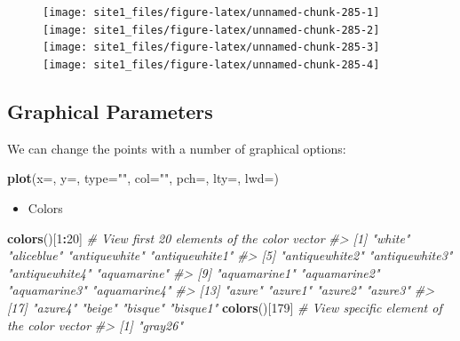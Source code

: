 \documentclass[]{book}
\newenvironment{Shaded}{\begin{snugshade}}{\end{snugshade}}
\newcommand{\CommentTok}[1]{\textcolor[rgb]{0.56,0.35,0.01}{\textit{#1}}}
\newcommand{\DataTypeTok}[1]{\textcolor[rgb]{0.13,0.29,0.53}{#1}}
\newcommand{\DecValTok}[1]{\textcolor[rgb]{0.00,0.00,0.81}{#1}}
\newcommand{\KeywordTok}[1]{\textcolor[rgb]{0.13,0.29,0.53}{\textbf{#1}}}
\newcommand{\NormalTok}[1]{#1}
\newcommand{\OperatorTok}[1]{\textcolor[rgb]{0.81,0.36,0.00}{\textbf{#1}}}
\newcommand{\StringTok}[1]{\textcolor[rgb]{0.31,0.60,0.02}{#1}}
\providecommand{\tightlist}{%
  \setlength{\itemsep}{0pt}\setlength{\parskip}{0pt}}
\begin{document}
\begin{figure}

{\centering \texttt{[image: site1\_files/figure-latex/unnamed-chunk-285-1]} \texttt{[image: site1\_files/figure-latex/unnamed-chunk-285-2]} \texttt{[image: site1\_files/figure-latex/unnamed-chunk-285-3]} \texttt{[image: site1\_files/figure-latex/unnamed-chunk-285-4]} 

}

\caption{ }\label{fig:unnamed-chunk-285}
\end{figure}

\hypertarget{graphical-parameters}{%
\subsection{Graphical Parameters}\label{graphical-parameters}}

We can change the points with a number of graphical options:

\begin{Shaded}
\begin{Highlighting}[]
\KeywordTok{plot}\NormalTok{(}\DataTypeTok{x=}\NormalTok{, }\DataTypeTok{y=}\NormalTok{, }\DataTypeTok{type=}\StringTok{""}\NormalTok{, }\DataTypeTok{col=}\StringTok{""}\NormalTok{, }\DataTypeTok{pch=}\NormalTok{, }\DataTypeTok{lty=}\NormalTok{, }\DataTypeTok{lwd=}\NormalTok{)}
\end{Highlighting}
\end{Shaded}

\begin{itemize}
\tightlist
\item
  Colors
\end{itemize}

\begin{Shaded}
\begin{Highlighting}[]
\KeywordTok{colors}\NormalTok{()[}\DecValTok{1}\OperatorTok{:}\DecValTok{20}\NormalTok{] }\CommentTok{# View first 20 elements of the color vector}
\CommentTok{#>  [1] "white"         "aliceblue"     "antiquewhite"  "antiquewhite1"}
\CommentTok{#>  [5] "antiquewhite2" "antiquewhite3" "antiquewhite4" "aquamarine"   }
\CommentTok{#>  [9] "aquamarine1"   "aquamarine2"   "aquamarine3"   "aquamarine4"  }
\CommentTok{#> [13] "azure"         "azure1"        "azure2"        "azure3"       }
\CommentTok{#> [17] "azure4"        "beige"         "bisque"        "bisque1"}
\KeywordTok{colors}\NormalTok{()[}\DecValTok{179}\NormalTok{] }\CommentTok{# View specific element of the color vector}
\CommentTok{#> [1] "gray26"}
\end{Highlighting}
\end{Shaded}
\end{document}
